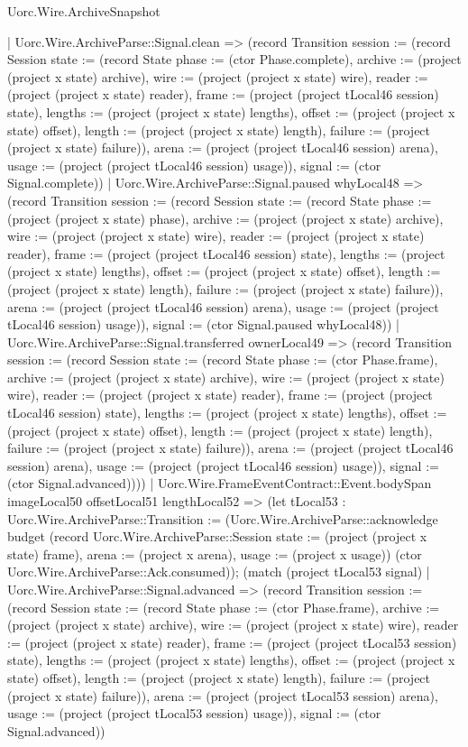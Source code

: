 \begin{lexlean}{Uorc.Wire.ArchiveSnapshot}
\begin{semanticmodule}
{        | Uorc.Wire.ArchiveParse::Signal.clean => (record Transition {session := (record Session {state := (record State {phase := (ctor Phase.complete), archive := (project (project x state) archive), wire := (project (project x state) wire), reader := (project (project x state) reader), frame := (project (project tLocal46 session) state), lengths := (project (project x state) lengths), offset := (project (project x state) offset), length := (project (project x state) length), failure := (project (project x state) failure)}), arena := (project (project tLocal46 session) arena), usage := (project (project tLocal46 session) usage)}), signal := (ctor Signal.complete)})
        | Uorc.Wire.ArchiveParse::Signal.paused whyLocal48 => (record Transition {session := (record Session {state := (record State {phase := (project (project x state) phase), archive := (project (project x state) archive), wire := (project (project x state) wire), reader := (project (project x state) reader), frame := (project (project tLocal46 session) state), lengths := (project (project x state) lengths), offset := (project (project x state) offset), length := (project (project x state) length), failure := (project (project x state) failure)}), arena := (project (project tLocal46 session) arena), usage := (project (project tLocal46 session) usage)}), signal := (ctor Signal.paused whyLocal48)})
        | Uorc.Wire.ArchiveParse::Signal.transferred ownerLocal49 => (record Transition {session := (record Session {state := (record State {phase := (ctor Phase.frame), archive := (project (project x state) archive), wire := (project (project x state) wire), reader := (project (project x state) reader), frame := (project (project tLocal46 session) state), lengths := (project (project x state) lengths), offset := (project (project x state) offset), length := (project (project x state) length), failure := (project (project x state) failure)}), arena := (project (project tLocal46 session) arena), usage := (project (project tLocal46 session) usage)}), signal := (ctor Signal.advanced)})))
      | Uorc.Wire.FrameEventContract::Event.bodySpan imageLocal50 offsetLocal51 lengthLocal52 => (let tLocal53 : Uorc.Wire.ArchiveParse::Transition := (Uorc.Wire.ArchiveParse::acknowledge budget (record Uorc.Wire.ArchiveParse::Session {state := (project (project x state) frame), arena := (project x arena), usage := (project x usage)}) (ctor Uorc.Wire.ArchiveParse::Ack.consumed)); (match (project tLocal53 signal)
        | Uorc.Wire.ArchiveParse::Signal.advanced => (record Transition {session := (record Session {state := (record State {phase := (ctor Phase.frame), archive := (project (project x state) archive), wire := (project (project x state) wire), reader := (project (project x state) reader), frame := (project (project tLocal53 session) state), lengths := (project (project x state) lengths), offset := (project (project x state) offset), length := (project (project x state) length), failure := (project (project x state) failure)}), arena := (project (project tLocal53 session) arena), usage := (project (project tLocal53 session) usage)}), signal := (ctor Signal.advanced)})
}
\end{semanticmodule}
\end{lexlean}
